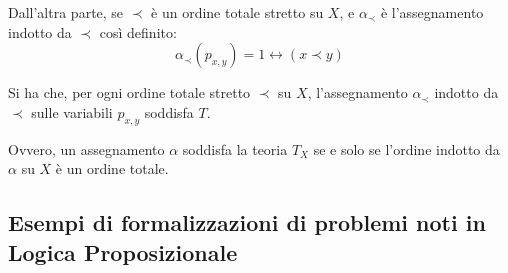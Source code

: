 \documentclass[a4paper,11pt]{report}
\begin{document}
Dall'altra parte, se \( \prec \) è un ordine totale stretto su \( X \), e \( \alpha_\prec \) è l'assegnamento indotto da \( \prec \) così definito:
\[ \alpha_\prec (p_{x,y}) = 1 \leftrightarrow (x \prec y) \]

Si ha che, per ogni ordine totale stretto \( \prec \) su \(X \), l'assegnamento \( \alpha_\prec \) indotto da \( \prec \) sulle variabili \( p_{x, y} \) soddisfa \( T \).

Ovvero, un assegnamento \( \alpha \) soddisfa la teoria \( T_X \) se e solo se l'ordine indotto da \( \alpha \) su \( X \) è un ordine totale.

\subsection{Esempi di formalizzazioni di problemi noti in Logica Proposizionale}
\end{document}
